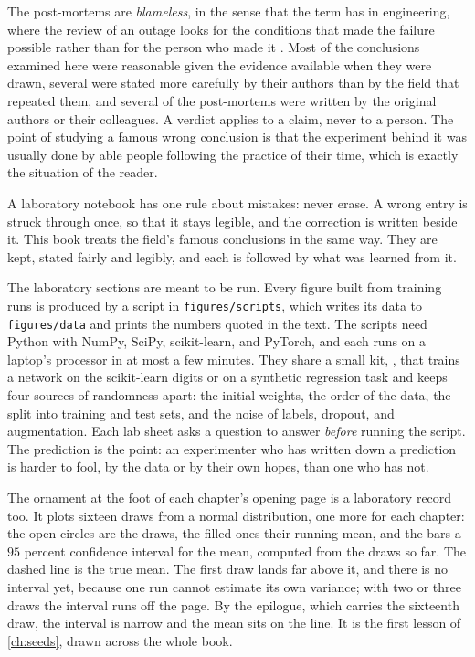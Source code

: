 \begin{refsection}
The post-mortems are \emph{blameless}, in the sense that the term has in engineering, where the review of an outage looks for the conditions that made the failure possible rather than for the person who made it \parencite{BeyerEtAl2016}. Most of the conclusions examined here were reasonable given the evidence available when they were drawn, several were stated more carefully by their authors than by the field that repeated them, and several of the post-mortems were written by the original authors or their colleagues. A verdict applies to a claim, never to a person. The point of studying a famous wrong conclusion is that the experiment behind it was usually done by able people following the practice of their time, which is exactly the situation of the reader.

A laboratory notebook has one rule about mistakes: never erase. A wrong entry is struck through once, so that it stays legible, and the correction is written beside it. This book treats the field's famous conclusions in the same way. They are kept, stated fairly and legibly, and each is followed by what was learned from it.


The laboratory sections are meant to be run. Every figure built from training runs is produced by a script in \texttt{figures/scripts}, which writes its data to \texttt{figures/data} and prints the numbers quoted in the text. The scripts need Python with NumPy, SciPy, scikit-learn, and PyTorch, and each runs on a laptop's processor in at most a few minutes. They share a small kit, , that trains a network on the scikit-learn digits or on a synthetic regression task and keeps four sources of randomness apart: the initial weights, the order of the data, the split into training and test sets, and the noise of labels, dropout, and augmentation. Each lab sheet asks a question to answer \emph{before} running the script. The prediction is the point: an experimenter who has written down a prediction is harder to fool, by the data or by their own hopes, than one who has not.

The ornament at the foot of each chapter's opening page is a laboratory record too. It plots sixteen draws from a normal distribution, one more for each chapter: the open circles are the draws, the filled ones their running mean, and the bars a $95$ percent confidence interval for the mean, computed from the draws so far. The dashed line is the true mean. The first draw lands far above it, and there is no interval yet, because one run cannot estimate its own variance; with two or three draws the interval runs off the page. By the epilogue, which carries the sixteenth draw, the interval is narrow and the mean sits on the line. It is the first lesson of \cref{ch:seeds}, drawn across the whole book.


\end{refsection}
